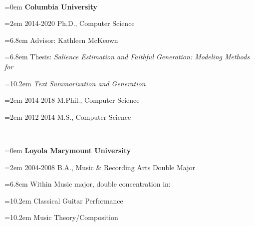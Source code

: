 \documentclass{scrartcl}
\newcommand{\MarginSection}[1]{\marginpar{#1}}
\newcommand{\NewEntry}[2]{\noindent\hangindent=0em\hangafter=0 \parbox{4em}{\small #1} #2 
\vspace{0.35em}} %
\begin{document}
\begin{cv}{}
 




 ~\\


{\noindent\hangindent=0em \MarginSection{Education}\textbf{Columbia University}

 \noindent\hangindent=2em 2014-2020 Ph.D., Computer Science 

\noindent\hangindent=6.8em Advisor: Kathleen McKeown

\noindent\hangindent=6.8em Thesis: \textit{Salience Estimation and Faithful Generation: Modeling Methods for}

\noindent\hangindent=10.2em \textit{Text Summarization and Generation}


\noindent\hangindent=2em 2014-2018 M.Phil., Computer Science 

\noindent\hangindent=2em 2012-2014 M.S., Computer Science 

}

{~\vspace{-1.25em}\\}

{\noindent\hangindent=0em \textbf{Loyola Marymount University} }

{\noindent\hangindent=2em 2004-2008 B.A., Music \& Recording Arts Double Major

}

\noindent\hangindent=6.8em Within Music major, double concentration in: 

\noindent\hangindent=10.2em Classical Guitar Performance 

\noindent\hangindent=10.2em Music Theory/Composition







\end{cv}
\end{document}
